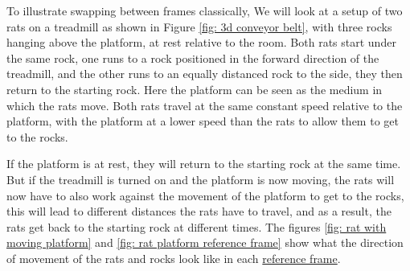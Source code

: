 To illustrate swapping between frames classically, We will look at a setup of two rats on a treadmill as shown in Figure \ref{fig: 3d conveyor belt}, with three rocks hanging above the platform, at rest relative to the room. Both rats start under the same rock, one runs to a rock positioned in the forward direction of the treadmill, and the other runs to an equally distanced rock to the side, they then return to the starting rock. Here the platform can be seen as the medium in which the rats move. Both rats travel at the same constant speed relative to the platform, with the platform at a lower speed than the rats to allow them to get to the rocks.

If the platform is at rest, they will return to the starting rock at the same time. But if the treadmill is turned on and the platform is now moving, the rats will now have to also work against the movement of the platform to get to the rocks, this will lead to different distances the rats have to travel, and as a result, the rats get back to the starting rock at different times. The figures \ref{fig: rat with moving platform} and \ref{fig: rat platform reference frame} show what the direction of movement of the rats and rocks look like in each \hyperlink{def-Reference-frame}{reference frame}.

